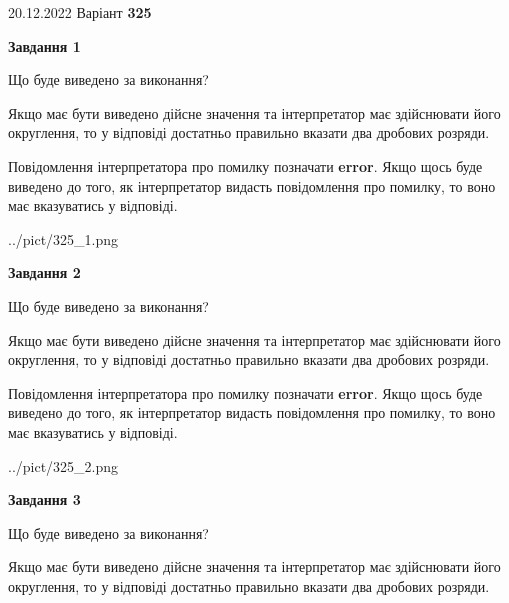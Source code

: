 \documentclass[12pt, ukrainian]{article}
\begin{document}
{20.12.2022 Варіант \No \textbf { 325 }\par}
{
\begin {Large}

{\begin {center}\textbf{Завдання 1}\end {center}}\par
Що буде виведено за виконання? \par

Якщо має бути виведено дійсне значення та інтерпретатор має здійснювати його округлення, 
то у відповіді достатньо правильно вказати два дробових розряди.

Повідомлення інтерпретатора про помилку позначати \textbf{error}.
Якщо щось буде виведено до того, як інтерпретатор видасть повідомлення про помилку, 
то воно має вказуватись у відповіді. \par

\begin{center}
	{../pict/325_1.png}
\end{center}
\newpage

{\begin {center}\textbf{Завдання 2}\end {center}}\par
Що буде виведено за виконання? \par

Якщо має бути виведено дійсне значення та інтерпретатор має здійснювати його округлення, 
то у відповіді достатньо правильно вказати два дробових розряди.

Повідомлення інтерпретатора про помилку позначати \textbf{error}.
Якщо щось буде виведено до того, як інтерпретатор видасть повідомлення про помилку, 
то воно має вказуватись у відповіді. \par

\begin{center}
	{../pict/325_2.png}
\end{center}
\newpage

{\begin {center}\textbf{Завдання 3}\end {center}}\par
Що буде виведено за виконання? \par

Якщо має бути виведено дійсне значення та інтерпретатор має здійснювати його округлення, 
то у відповіді достатньо правильно вказати два дробових розряди.


\end{Large}}
\end{document}
